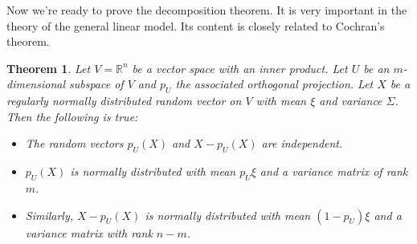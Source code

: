 \documentclass[12pt, a4paper]{article}
\newtheorem{theorem}{Theorem}[section]
\numberwithin{equation}{section}
\begin{document}
Now we're ready to prove the decomposition theorem. It is very important in the theory of the general linear model. Its content is closely related to Cochran's theorem.
\begin{theorem}
Let $V=\mathbb{R}^n$ be a vector space with an inner product. Let $U$ be an $m$-dimensional subspace of $V$ and $p_U$ the associated orthogonal projection. Let $X$ be a regularly normally distributed random vector on $V$ with mean $\xi$ and variance $\Sigma$. Then the following is true:
\begin{itemize}
\item The random vectors $p_U(X)$ and $X-p_U(X)$ are independent.
\item $p_U(X)$ is normally distributed with mean $p_U\xi$ and a variance matrix of rank $m$.
\item Similarly, $X-p_U(X)$ is normally distributed with mean $(1-p_U)\xi$ and a variance matrix with rank $n-m$.
\end{itemize}
\end{theorem}
\end{document}
